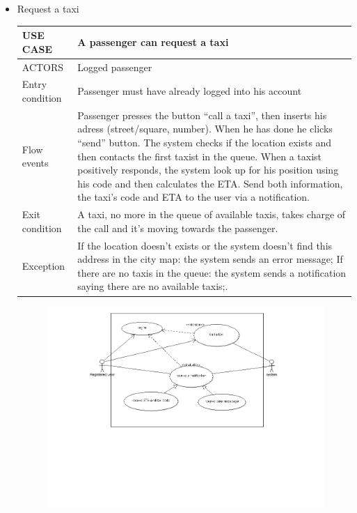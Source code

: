 \begin{itemize}
\item Request a taxi
	\begin{center}
   	 \begin{tabular}{ | l | p{11cm} |}
   	 \hline
   	USE CASE & A passenger can request a taxi\\ \hline
   	 ACTORS & Logged passenger \\ \hline
    	 Entry condition & Passenger must have already logged into his account \\ \hline
    	 Flow events & Passenger presses the button “call a taxi”, then inserts his adress (street/square, number). When he has done he clicks “send” button. The system checks if the location exists and then contacts the first taxist in the queue.
	When a taxist positively responds, the system look up for his position using his code and then calculates the ETA. Send both information, the taxi’s code and ETA to the user via a notification. \\ \hline
  	   Exit condition & A taxi, no more in the queue of available taxis, takes charge of the call and it’s moving towards the passenger.\\ \hline
  	   Exception &  If the location doesn’t exists or the system doesn’t find this address in the city map: the system sends an error 	message;
	If there are no taxis in the queue: the system sends a notification saying there are no available taxis;.\\ \hline
    \end{tabular}
	\end{center}
	\begin{center}
	\begin{figure} [h]
    	\includegraphics [scale=0.4]{callataxi.png}

\end{figure}
\end{center}
\end{itemize}
